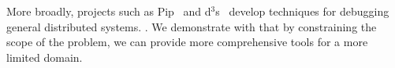 More broadly, projects such as Pip~\cite{pip} and d$^3$s~\cite{d3s} develop
techniques for debugging general distributed systems. . We demonstrate with \projectname{} that by constraining the scope of the problem,
we can provide more comprehensive tools for a more limited domain. 






